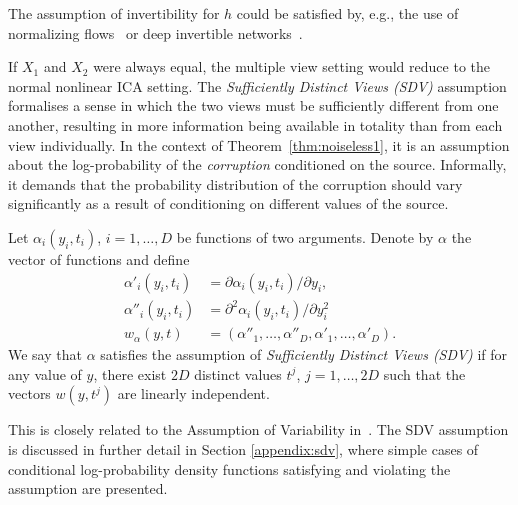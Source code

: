 The assumption of invertibility for $h$ could be satisfied by, e.g., the use of normalizing flows~\citep{rezende2015variational, chen2018neural} or deep invertible networks~\citep{jacobsen_hal-01712808}.


If $X_1$ and $X_2$ were always equal, the multiple view setting would reduce to the normal nonlinear ICA setting.
The \emph{Sufficiently Distinct Views (SDV)} assumption formalises a sense in which the two views must be sufficiently different from one another,
resulting in more information being available in totality than from each view individually.
In the context of Theorem~\ref{thm:noiseless1}, it is an assumption about the log-probability of the \emph{corruption} conditioned on the source.
Informally, it demands that the probability distribution of the corruption should vary significantly as a result of conditioning on different values of the source.

\medskip

\begin{definition}\label{suff_dist_assumption}
	Let $\alpha_i(y_i, t_i)$, $i=1,\ldots, D$ be functions of two arguments.
	Denote by $\alpha$ the vector of functions and define
	\begin{align}
	\alpha'_{i}(y_i, t_i)&= \partial \alpha_{i}(y_i, t_i)/\partial y_i, \label{eq:convention1}\\
	\alpha''_{i}(y_i, t_i)&=\partial^2 \alpha_{i}(y_i, t_i)/\partial y_i^2\, \label{eq:convention2}\\
	{w}_{\alpha}({y}, {t}) &= (\alpha''_{1}, \ldots, \alpha''_{D}, \alpha'_{1}, \ldots,\alpha'_{D}).
	\end{align}
	We say that ${\alpha}$ satisfies the assumption of \emph{Sufficiently Distinct Views (SDV)} if for any value of ${y}$, there exist $2D$ distinct values ${t}^j$, $j=1, \ldots, 2D$ such that the vectors ${w}({y},{t}^j)$ are linearly independent.
	\\    \end{definition}
This is closely related to the Assumption of Variability in~\cite{hyvarinen19a}.
The SDV assumption is discussed in further detail in Section \ref{appendix:sdv}, where simple cases of conditional log-probability density functions satisfying and violating the assumption are presented.




